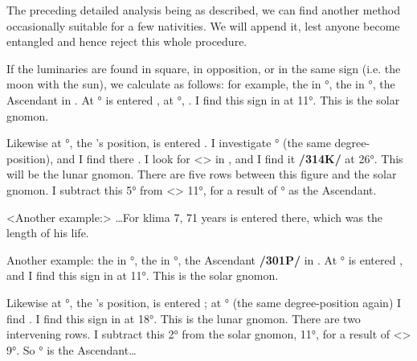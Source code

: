 The preceding detailed analysis being as described, we can find another method occasionally suitable for a few nativities. We will append it, lest anyone become entangled and hence reject this whole
procedure. 

If the luminaries are found in square, in opposition, or in the same sign (i.e. the moon with the sun), we calculate as follows: for example, the \Sun\xspace in \Sagittarius\xspace 30°, the \Moon\xspace in \Sagittarius\xspace 25°, the Ascendant in \Virgo. At \Sagittarius\xspace 30° is entered \Aries, at \Aries\xspace 30°, \Scorpio. I find this sign in \Virgo\xspace at 11°. This is the solar gnomon. 

Likewise at \Sagittarius\xspace 25°, the \Moon’s position, is entered \Scorpio.  I investigate \Scorpio\xspace 25° (the same degree-position), and I find there \Gemini. I look for <\Gemini> in \Virgo, and I find it \textbf{/314K/} at 26°. This will be the lunar gnomon. There are five rows between this figure and the solar gnomon. I subtract this 5° from <\Virgo> 11°, for a result of ° as the Ascendant. 

<Another example:> …For klima 7, 71 years is entered there, which was the length of his life.

Another example: the \Sun\xspace in \Sagittarius\xspace 3°, the \Moon\xspace in \Sagittarius\xspace 7°, the Ascendant \textbf{/301P/} in \Libra. At \Sagittarius\xspace 3° is entered \Sagittarius, and I find this sign in \Libra\xspace at 11°. This is the solar gnomon. 

Likewise at \Sagittarius\xspace 7°, the \Moon’s position, is entered \Cancer; at \Cancer\xspace 7° (the same degree-position again) I find \Aries. I find this sign in \Libra\xspace at 18°. This is the lunar gnomon. There are two intervening rows. I subtract this 2° from the solar gnomon, 11°, for a result of <\Libra> 9°. So \Libra\xspace
9° is the Ascendant…

